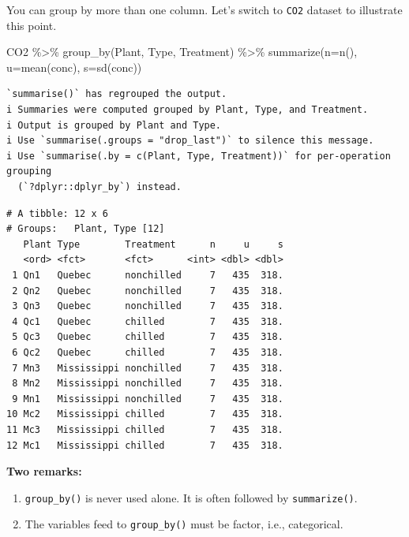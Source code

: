 \documentclass[
  letterpaper,
]{book}
\newenvironment{Shaded}{\begin{snugshade}}{\end{snugshade}}
\newcommand{\AttributeTok}[1]{\textcolor[rgb]{0.40,0.45,0.13}{#1}}
\newcommand{\FunctionTok}[1]{\textcolor[rgb]{0.28,0.35,0.67}{#1}}
\newcommand{\NormalTok}[1]{\textcolor[rgb]{0.00,0.23,0.31}{#1}}
\newcommand{\SpecialCharTok}[1]{\textcolor[rgb]{0.37,0.37,0.37}{#1}}
\begin{document}
You can group by more than one column. Let's switch to \texttt{CO2}
dataset to illustrate this point.

\begin{Shaded}
\begin{Highlighting}[]
\NormalTok{CO2 }\SpecialCharTok{\%\textgreater{}\%}
  \FunctionTok{group\_by}\NormalTok{(Plant, Type, Treatment) }\SpecialCharTok{\%\textgreater{}\%}
  \FunctionTok{summarize}\NormalTok{(}\AttributeTok{n=}\FunctionTok{n}\NormalTok{(),}
            \AttributeTok{u=}\FunctionTok{mean}\NormalTok{(conc),}
            \AttributeTok{s=}\FunctionTok{sd}\NormalTok{(conc))}
\end{Highlighting}
\end{Shaded}

\begin{verbatim}
`summarise()` has regrouped the output.
i Summaries were computed grouped by Plant, Type, and Treatment.
i Output is grouped by Plant and Type.
i Use `summarise(.groups = "drop_last")` to silence this message.
i Use `summarise(.by = c(Plant, Type, Treatment))` for per-operation grouping
  (`?dplyr::dplyr_by`) instead.
\end{verbatim}

\begin{verbatim}
# A tibble: 12 x 6
# Groups:   Plant, Type [12]
   Plant Type        Treatment      n     u     s
   <ord> <fct>       <fct>      <int> <dbl> <dbl>
 1 Qn1   Quebec      nonchilled     7   435  318.
 2 Qn2   Quebec      nonchilled     7   435  318.
 3 Qn3   Quebec      nonchilled     7   435  318.
 4 Qc1   Quebec      chilled        7   435  318.
 5 Qc3   Quebec      chilled        7   435  318.
 6 Qc2   Quebec      chilled        7   435  318.
 7 Mn3   Mississippi nonchilled     7   435  318.
 8 Mn2   Mississippi nonchilled     7   435  318.
 9 Mn1   Mississippi nonchilled     7   435  318.
10 Mc2   Mississippi chilled        7   435  318.
11 Mc3   Mississippi chilled        7   435  318.
12 Mc1   Mississippi chilled        7   435  318.
\end{verbatim}

\textbf{Two remarks:}

\begin{enumerate}
\def\labelenumi{\arabic{enumi}.}
\item
  \texttt{group\_by()} is never used alone. It is often followed by
  \texttt{summarize()}.
\item
  The variables feed to \texttt{group\_by()} must be factor, i.e.,
  categorical.
\end{enumerate}
\end{document}
